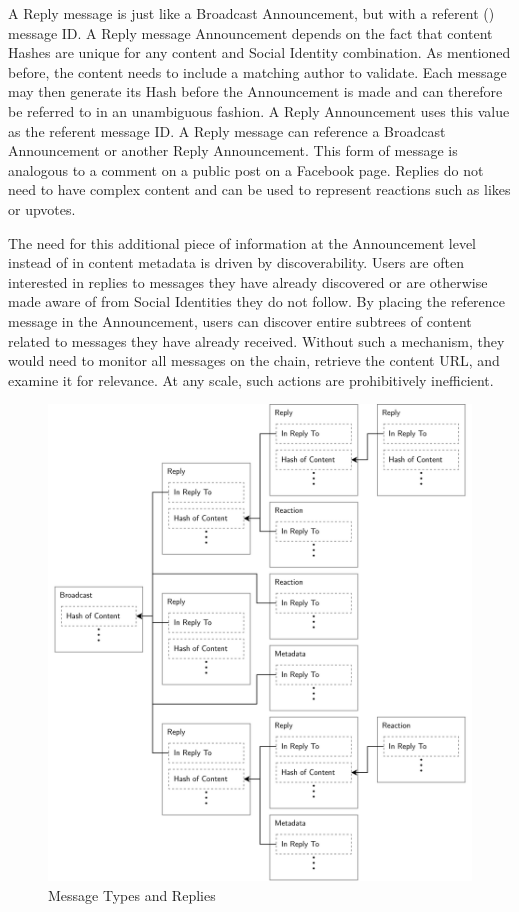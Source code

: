 \documentclass[12pt,letterpaper]{article}
\begin{document}
A Reply message is just like a Broadcast Announcement, but with a referent () message ID. A Reply message Announcement depends on the fact that content Hashes are
unique for any content and Social Identity combination. As mentioned before, the content
needs to include a matching author to validate. Each message may then generate its Hash
before the Announcement is made and can therefore be referred to in an unambiguous
fashion. A Reply Announcement uses this value as the referent message ID. A Reply message
can reference a Broadcast Announcement or another Reply Announcement. This form of message
is analogous to a comment on a public post on a Facebook page. Replies do not need to have
complex content and can be used to represent reactions such as likes or upvotes.

The need for this additional piece of information at the Announcement level instead of in
content metadata is driven by discoverability. Users are often interested in replies to
messages they have already discovered or are otherwise made aware of from Social Identities
they do not follow. By placing the reference message in the Announcement, users can discover
entire subtrees of content related to messages they have already received.  Without such a
mechanism, they would need to monitor all messages on the chain, retrieve the content URL,
and examine it for relevance. At any scale, such actions are prohibitively inefficient.

\begin{figure}
	\includegraphics[width=\linewidth]{figures/Message Types and Replies.png}
	\caption{Message Types and Replies}
	\label{fig:6}
\end{figure}
\end{document}
